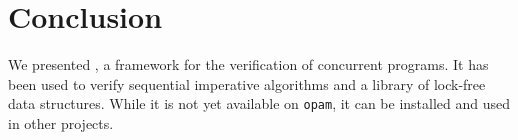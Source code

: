 \section{Conclusion}

We presented \Zoo, a framework for the verification of concurrent \OCamlFive programs.
It has been used to verify sequential imperative algorithms and a library of lock-free data structures.
While it is not yet available on \texttt{opam}, it can be installed and used in other \Rocq projects.
